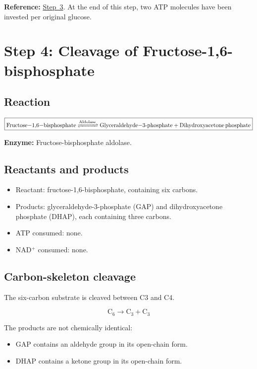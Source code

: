 \documentclass[11pt,a4paper]{article}
\newcommand{\stepref}[1]{\hyperref[step:#1]{Step~#1}}
\newcommand{\Enz}[1]{\textbf{Enzyme:} #1}
\newcommand{\Note}[1]{\par\smallskip
  \noindent\colorbox{gray!12}{
    \parbox{0.96\linewidth}{#1}
  }\par\smallskip}
\begin{document}
\Note{
\textbf{Reference:} \stepref{3}. At the end of this step, two ATP
molecules have been invested per original glucose.
}

\section{Step 4: Cleavage of Fructose-1,6-bisphosphate}
\label{step:4}

\subsection{Reaction}

\[
\boxed{
\ce{
Fructose-1,6-bisphosphate
<=>[Aldolase]
Glyceraldehyde-3-phosphate + Dihydroxyacetone phosphate
}
}
\]

\Enz{Fructose-bisphosphate aldolase.}

\subsection{Reactants and products}

\begin{itemize}
  \item Reactant: fructose-1,6-bisphosphate, containing six carbons.
  \item Products: glyceraldehyde-3-phosphate (GAP) and
  dihydroxyacetone phosphate (DHAP), each containing three carbons.
  \item ATP consumed: none.
  \item NAD$^+$ consumed: none.
\end{itemize}

\subsection{Carbon-skeleton cleavage}

The six-carbon substrate is cleaved between C3 and C4.

\[
\boxed{
\mathrm{C_6 \longrightarrow C_3 + C_3}
}
\]

The products are not chemically identical:

\begin{itemize}
  \item GAP contains an aldehyde group in its open-chain form.
  \item DHAP contains a ketone group in its open-chain form.
\end{itemize}
\end{document}
